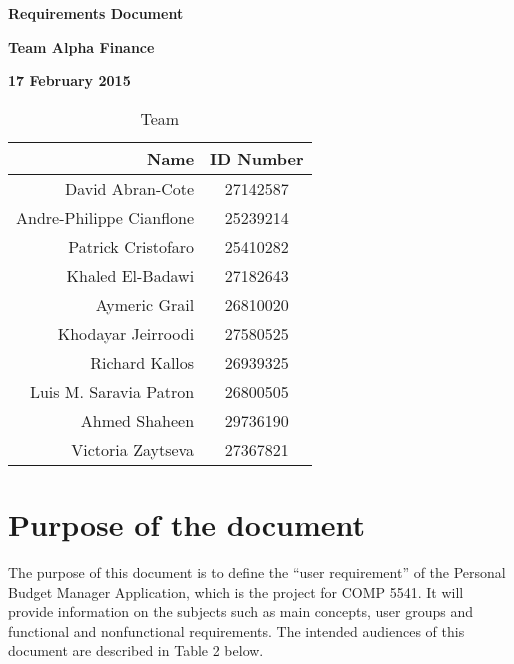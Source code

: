 \documentclass[12pt]{article}
\begin{document}
\vspace*{0.5in}
\centerline{\bf\Large Requirements Document}

\vspace*{0.5in}
\centerline{\bf\Large Team Alpha Finance}

\vspace*{0.5in}
\centerline{\bf\Large 17 February 2015}

\vspace*{1.5in}
\begin{table}[htbp]
\caption{Team}
\begin{center}
\begin{tabular}{|r | c|}
\hline
Name & ID Number \\
\hline\hline
David Abran-Cote & 27142587 \\
Andre-Philippe Cianflone & 25239214 \\
Patrick Cristofaro & 25410282 \\
Khaled El-Badawi & 27182643 \\
Aymeric Grail & 26810020 \\
Khodayar Jeirroodi & 27580525\\
Richard Kallos & 26939325\\
Luis M. Saravia Patron & 26800505\\
Ahmed Shaheen & 29736190\\
Victoria Zaytseva & 27367821\\
\hline
\end{tabular}
\end{center}
\end{table}

\clearpage

\tableofcontents

\clearpage

\section{Purpose of the document} \label{purpose}
  The purpose of this document is to define the “user requirement” of the Personal Budget Manager Application, which is the project for COMP 5541.  It will provide information on the 
  subjects such as main concepts, user groups and functional and nonfunctional requirements. The intended audiences of this document are described in Table 2 below.
\end{document}
